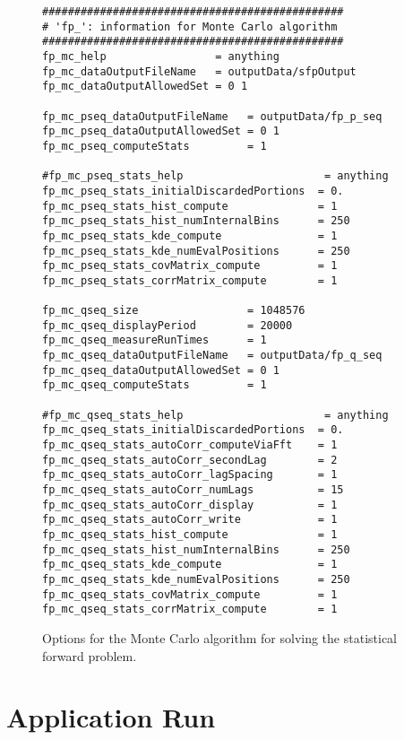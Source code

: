 \begin{figure}[h!]
\begin{center}
\begin{verbatim}
###############################################
# 'fp_': information for Monte Carlo algorithm
###############################################
fp_mc_help                 = anything
fp_mc_dataOutputFileName   = outputData/sfpOutput
fp_mc_dataOutputAllowedSet = 0 1

fp_mc_pseq_dataOutputFileName   = outputData/fp_p_seq
fp_mc_pseq_dataOutputAllowedSet = 0 1
fp_mc_pseq_computeStats         = 1

#fp_mc_pseq_stats_help                      = anything
fp_mc_pseq_stats_initialDiscardedPortions  = 0.
fp_mc_pseq_stats_hist_compute              = 1
fp_mc_pseq_stats_hist_numInternalBins      = 250
fp_mc_pseq_stats_kde_compute               = 1
fp_mc_pseq_stats_kde_numEvalPositions      = 250
fp_mc_pseq_stats_covMatrix_compute         = 1
fp_mc_pseq_stats_corrMatrix_compute        = 1

fp_mc_qseq_size                 = 1048576
fp_mc_qseq_displayPeriod        = 20000
fp_mc_qseq_measureRunTimes      = 1
fp_mc_qseq_dataOutputFileName   = outputData/fp_q_seq
fp_mc_qseq_dataOutputAllowedSet = 0 1
fp_mc_qseq_computeStats         = 1

#fp_mc_qseq_stats_help                      = anything
fp_mc_qseq_stats_initialDiscardedPortions  = 0.
fp_mc_qseq_stats_autoCorr_computeViaFft    = 1
fp_mc_qseq_stats_autoCorr_secondLag        = 2
fp_mc_qseq_stats_autoCorr_lagSpacing       = 1
fp_mc_qseq_stats_autoCorr_numLags          = 15
fp_mc_qseq_stats_autoCorr_display          = 1
fp_mc_qseq_stats_autoCorr_write            = 1
fp_mc_qseq_stats_hist_compute              = 1
fp_mc_qseq_stats_hist_numInternalBins      = 250
fp_mc_qseq_stats_kde_compute               = 1
fp_mc_qseq_stats_kde_numEvalPositions      = 250
fp_mc_qseq_stats_covMatrix_compute         = 1
fp_mc_qseq_stats_corrMatrix_compute        = 1
\end{verbatim}
\end{center}
\caption{
Options for the Monte Carlo algorithm for solving the statistical forward problem.
}
\label{fig-options-input-3}
\end{figure}

\clearpage
\section{Application Run}

\clearpage
